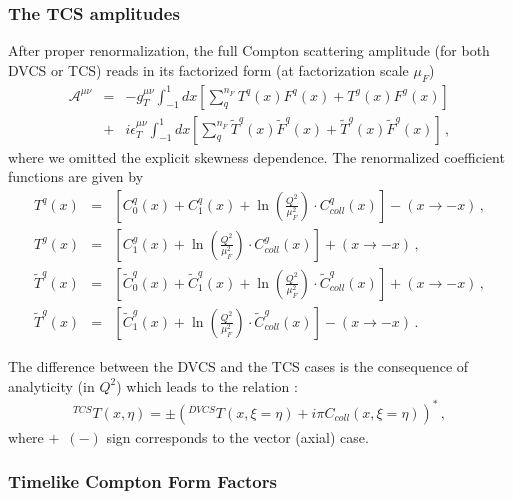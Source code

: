\subsubsection{The TCS amplitudes}
After proper renormalization, the full Compton scattering amplitude (for both
DVCS or TCS) reads in its factorized form (at factorization scale $\mu_F$)
\begin{eqnarray}
\mathcal{A}^{\mu\nu} &=& -g_T^{\mu\nu}\int_{-1}^1 dx 
\left[
\sum_q^{n_F} T^q(x) F^q(x)+T^g(x) F^g(x)
\right] \nonumber \\
&+& i\epsilon_T ^{\mu\nu}\int_{-1}^1 dx 
\left[
\sum_q^{n_F} \widetilde{T}^q(x) \widetilde{F}^q(x)+\widetilde{T}^g(x) \widetilde{F}^g(x)
\right] \,,
\label{eq:factorizedamplitude}
\end{eqnarray}
where we omitted the explicit skewness dependence.
The renormalized coefficient functions are given by
\begin{eqnarray}
T^q(x)&=& \left[ C_{0}^q(x) +C_1^q(x) +\ln\left(\frac{Q^2}{\mu^2_F}\right) \cdot C_{coll}^q(x)\right] - ( x \to -x )  \,,\nonumber\\
T^g(x) &=& \left[ C_1^g(x) +\ln\left(\frac{Q^2}{\mu^2_F}\right) \cdot C_{coll}^g(x)\right] +( x \to -x )\,,\nonumber\\
\widetilde{T}^q(x)&=& \left[
\widetilde{C}_{0}^q(x) +\widetilde{C}_1^q(x) +\ln\left(\frac{Q^2}{\mu^2_F}\right) \cdot \widetilde{C}_{coll}^q (x)\right]
+( x \to -x )
\,,\nonumber\\
\widetilde{T}^g(x) &=&   \left[
\widetilde{C}_1^g(x) +\ln\left(\frac{Q^2}{\mu^2_F}\right) \cdot \widetilde{C}_{coll}^g(x)\right] - ( x \to -x )\,.
\label{eq:ceofficients}
\end{eqnarray} 

The difference between the DVCS and the TCS cases is the consequence of
analyticity (in $Q^2$) which leads to the relation \cite{Muller:2012yq}:
\begin{eqnarray}
^{TCS}T(x,\eta) = \pm \left(^{DVCS}T(x,\xi=\eta) +  i \pi C_{coll}(x,\xi = \eta)\right)^* \,,
\label{eq:TCSvsDVCS}
\end{eqnarray}
where $+$~$(-)$ sign corresponds to the vector (axial) case.



\subsubsection{Timelike Compton Form Factors}

